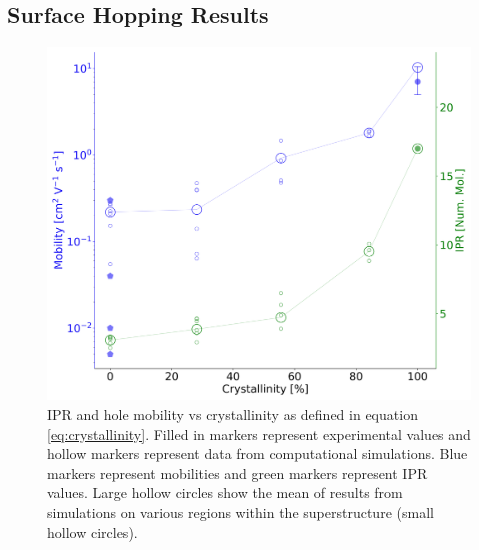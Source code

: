 \subsection{Surface Hopping Results}
\begin{figure}[htp] 
  \includegraphics[width=\textwidth]{./img/DifferentQuenchTimes/mobilities.png}
  \caption{\label{fig:mobilities}IPR and hole mobility vs crystallinity as defined in equation \eqref{eq:crystallinity}. Filled in markers represent experimental values and hollow markers represent data from computational simulations. Blue markers represent mobilities and green markers represent IPR values. Large hollow circles show the mean of results from simulations on various regions within the superstructure (small hollow circles).}
\end{figure}
